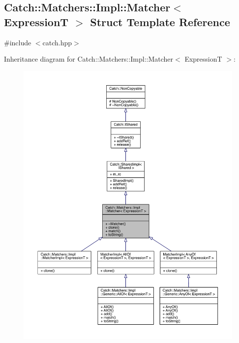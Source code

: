 \hypertarget{a00047}{}\subsection{Catch\+:\+:Matchers\+:\+:Impl\+:\+:Matcher$<$ Expression\+T $>$ Struct Template Reference}
\label{a00047}


{\ttfamily \#include $<$catch.\+hpp$>$}



Inheritance diagram for Catch\+:\+:Matchers\+:\+:Impl\+:\+:Matcher$<$ Expression\+T $>$\+:\nopagebreak
\begin{figure}[H]
\begin{center}
\leavevmode
\includegraphics[width=350pt]{a00336}
\end{center}
\end{figure}


